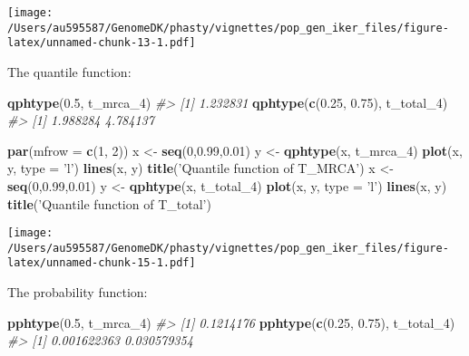 \documentclass[]{article}
\newenvironment{Shaded}{\begin{snugshade}}{\end{snugshade}}
\newcommand{\CommentTok}[1]{\textcolor[rgb]{0.56,0.35,0.01}{\textit{#1}}}
\newcommand{\DataTypeTok}[1]{\textcolor[rgb]{0.13,0.29,0.53}{#1}}
\newcommand{\DecValTok}[1]{\textcolor[rgb]{0.00,0.00,0.81}{#1}}
\newcommand{\FloatTok}[1]{\textcolor[rgb]{0.00,0.00,0.81}{#1}}
\newcommand{\KeywordTok}[1]{\textcolor[rgb]{0.13,0.29,0.53}{\textbf{#1}}}
\newcommand{\NormalTok}[1]{#1}
\newcommand{\StringTok}[1]{\textcolor[rgb]{0.31,0.60,0.02}{#1}}
\begin{document}
\texttt{[image: /Users/au595587/GenomeDK/phasty/vignettes/pop\_gen\_iker\_files/figure-latex/unnamed-chunk-13-1.pdf]}

The quantile function:

\begin{Shaded}
\begin{Highlighting}[]
\KeywordTok{qphtype}\NormalTok{(}\FloatTok{0.5}\NormalTok{, t_mrca_}\DecValTok{4}\NormalTok{)}
\CommentTok{#> [1] 1.232831}
\KeywordTok{qphtype}\NormalTok{(}\KeywordTok{c}\NormalTok{(}\FloatTok{0.25}\NormalTok{, }\FloatTok{0.75}\NormalTok{), t_total_}\DecValTok{4}\NormalTok{)}
\CommentTok{#> [1] 1.988284 4.784137}
\end{Highlighting}
\end{Shaded}

\begin{Shaded}
\begin{Highlighting}[]
\KeywordTok{par}\NormalTok{(}\DataTypeTok{mfrow =} \KeywordTok{c}\NormalTok{(}\DecValTok{1}\NormalTok{, }\DecValTok{2}\NormalTok{))}
\NormalTok{x <-}\StringTok{ }\KeywordTok{seq}\NormalTok{(}\DecValTok{0}\NormalTok{,}\FloatTok{0.99}\NormalTok{,}\FloatTok{0.01}\NormalTok{)}
\NormalTok{y <-}\StringTok{ }\KeywordTok{qphtype}\NormalTok{(x, t_mrca_}\DecValTok{4}\NormalTok{)}
\KeywordTok{plot}\NormalTok{(x, y, }\DataTypeTok{type =} \StringTok{'l'}\NormalTok{)}
\KeywordTok{lines}\NormalTok{(x, y)}
\KeywordTok{title}\NormalTok{(}\StringTok{'Quantile function of T_MRCA'}\NormalTok{)}
\NormalTok{x <-}\StringTok{ }\KeywordTok{seq}\NormalTok{(}\DecValTok{0}\NormalTok{,}\FloatTok{0.99}\NormalTok{,}\FloatTok{0.01}\NormalTok{)}
\NormalTok{y <-}\StringTok{ }\KeywordTok{qphtype}\NormalTok{(x, t_total_}\DecValTok{4}\NormalTok{)}
\KeywordTok{plot}\NormalTok{(x, y, }\DataTypeTok{type =} \StringTok{'l'}\NormalTok{)}
\KeywordTok{lines}\NormalTok{(x, y)}
\KeywordTok{title}\NormalTok{(}\StringTok{'Quantile function of T_total'}\NormalTok{)}
\end{Highlighting}
\end{Shaded}

\texttt{[image: /Users/au595587/GenomeDK/phasty/vignettes/pop\_gen\_iker\_files/figure-latex/unnamed-chunk-15-1.pdf]}

The probability function:

\begin{Shaded}
\begin{Highlighting}[]
\KeywordTok{pphtype}\NormalTok{(}\FloatTok{0.5}\NormalTok{, t_mrca_}\DecValTok{4}\NormalTok{)}
\CommentTok{#> [1] 0.1214176}
\KeywordTok{pphtype}\NormalTok{(}\KeywordTok{c}\NormalTok{(}\FloatTok{0.25}\NormalTok{, }\FloatTok{0.75}\NormalTok{), t_total_}\DecValTok{4}\NormalTok{)}
\CommentTok{#> [1] 0.001622363 0.030579354}
\end{Highlighting}
\end{Shaded}
\end{document}
